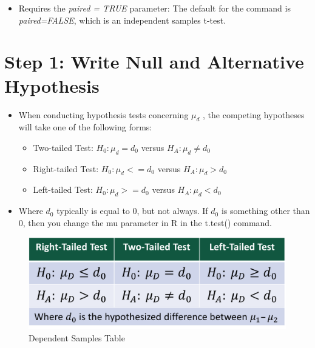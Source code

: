 \documentclass[
  letterpaper,
  DIV=11,
  numbers=noendperiod]{scrreprt}
\providecommand{\tightlist}{%
  \setlength{\itemsep}{0pt}\setlength{\parskip}{0pt}}\usepackage{longtable,booktabs,array}
\begin{document}
\begin{itemize}
\tightlist
\item
  Requires the \emph{paired = TRUE} parameter: The default for the
  command is \emph{paired=FALSE}, which is an independent samples
  t-test.
\end{itemize}

\section{Step 1: Write Null and Alternative
Hypothesis}\label{step-1-write-null-and-alternative-hypothesis}

\begin{itemize}
\tightlist
\item
  When conducting hypothesis tests concerning \(\mu_d\) , the competing
  hypotheses will take one of the following forms:

  \begin{itemize}
  \tightlist
  \item
    Two-tailed Test: \(H_0: \mu_d  = d_0\) versus
    \(H_A: \mu_d \neq  d_0\)
  \item
    Right-tailed Test: \(H_0: \mu_d <= d_0\) versus \(H_A: \mu_d>  d_0\)
  \item
    Left-tailed Test: \(H_0: \mu_d >= d_0\) versus \(H_A: \mu_d< d_0\)
  \end{itemize}
\item
  Where \(d_0\) typically is equal to 0, but not always. If \(d_0\) is
  something other than 0, then you change the mu parameter in R in the
  t.test() command.
\end{itemize}

\begin{figure}[H]

{\centering \includegraphics{Pictures/Ch6/TableDepSamp.png}

}

\caption{Dependent Samples Table}

\end{figure}%
\end{document}
